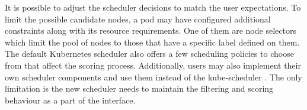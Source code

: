 It is possible to adjust the scheduler decisions to match the user expectations. 
To limit the possible candidate nodes, a pod may have configured additional constraints along with its resource requirements.
One of them are node selectors which limit the pool of nodes to those that have a specific label defined on them.
The default Kubernetes scheduler also offers a few scheduling policies to choose from that affect the scoring process.
Additionally, users may also implement their own scheduler components and use them instead of the kube-scheduler \cite{b:Kubernetes-scheduler}.
The only limitation is the new scheduler needs to maintain the filtering and scoring behaviour as a part of the interface.

